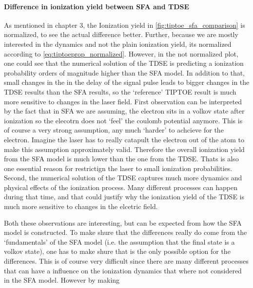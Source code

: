 \paragraph{Difference in ionization yield between SFA and TDSE}
As mentioned in chapter 3, the Ionization yield in \ref{fig:tiptoe_sfa_comparison} is normalized, to see the actual difference better.
Further, because we are mostly interested in the dynamics and not the plain ionization yield, its normalized according to \eqref{eq:tiptoeprop_normalized}.
However, in the not normalized plot, one could see that the numerical solution of the TDSE is predicting a ionization probability orders of magnitude higher than the SFA model.
In addition to that, small changes in the in the delay of the signal pulse leads to bigger changes in the TDSE results than the SFA results, so the `reference' TIPTOE result is much more sensitive to changes in the laser field.
First observation can be interpreted by the fact that in SFA we are assuming, the electron sits in a volkov state after ionization so the elecotrn does not `feel' the coulomb potential anymore.
This is of course a very strong assumption, any much `harder' to achcieve for the electron. 
Imagine the laser has to really catapult the electron out of the atom to make this assumption approximately valid.
Therefore the overall ionization yield from the SFA model is much lower than the one from the TDSE.
Thats is also one essential reason for restrictign the laser to small ionization probabilities.
Second, the numerical solution of the TDSE captures much more dynamics and physical effects of the ionization process.
Many different processes can happen during that time, and that could justify why the ionization yield of the TDSE is much more sensitive to changes in the elcetric field.

Both these observations are interesting, but can be expected from how the SFA model is constructed.
To make shure that the differences really do come from the `fundamentals' of the SFA model (i.e. the assumption that the final state is a volkov state), one has to make shure that is the only possible option for the differences.
This is of course very difficult since there are many different processes that can have a influence on the ionization dynamics that where not considered in the SFA model.
However by making 

















